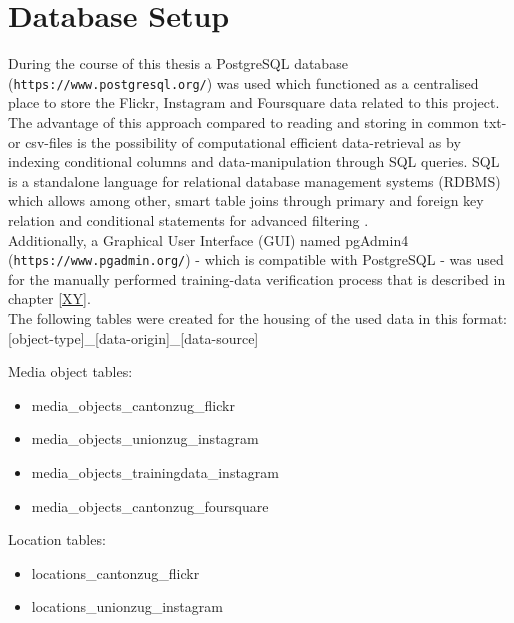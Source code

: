 \section{Database Setup} \label{database_setup}
During the course of this thesis a PostgreSQL database (\texttt{https://www.postgresql.org/}) was used which functioned as a centralised place to store the Flickr, Instagram and Foursquare data related to this project. The advantage of this approach compared to reading and storing in common txt- or csv-files is the possibility of computational efficient data-retrieval as by indexing conditional columns and data-manipulation through SQL queries. SQL is a standalone language for relational database management systems (RDBMS) which allows among other, smart table joins through primary and foreign key relation and conditional statements for advanced filtering \cite{PostgreSQL2019PostgreSQLDocumentation}.\\
Additionally, a Graphical User Interface (GUI) named pgAdmin4 (\texttt{https://www.pgadmin.org/}) - which is compatible with PostgreSQL - was used for the manually performed training-data verification process that is described in chapter \ref{XY}.\\
The following tables were created for the housing of the used data in this format: [object-type]\_[data-origin]\_[data-source] \\
\newline

Media object tables:\\
\begin{itemize}
    \item media\_objects\_cantonzug\_flickr
    \item media\_objects\_unionzug\_instagram
    \item media\_objects\_trainingdata\_instagram
    \item media\_objects\_cantonzug\_foursquare
\end{itemize}
\newline
Location tables:\\
\begin{itemize}
    \item locations\_cantonzug\_flickr
    \item locations\_unionzug\_instagram
\end{itemize}

